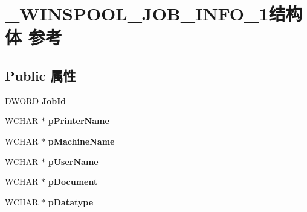 \hypertarget{struct___w_i_n_s_p_o_o_l___j_o_b___i_n_f_o__1}{}\section{\+\_\+\+W\+I\+N\+S\+P\+O\+O\+L\+\_\+\+J\+O\+B\+\_\+\+I\+N\+F\+O\+\_\+1结构体 参考}
\label{struct___w_i_n_s_p_o_o_l___j_o_b___i_n_f_o__1}
\subsection*{Public 属性}
\begin{DoxyCompactItemize}
\item 
\mbox{\label{struct___w_i_n_s_p_o_o_l___j_o_b___i_n_f_o__1_a94ffe601af1f9a21d54978d5e63fa25c}} 
D\+W\+O\+RD {\bfseries Job\+Id}
\item 
\mbox{\label{struct___w_i_n_s_p_o_o_l___j_o_b___i_n_f_o__1_a82a255349afd0050f0608d9618446687}} 
W\+C\+H\+AR $\ast$ {\bfseries p\+Printer\+Name}
\item 
\mbox{\label{struct___w_i_n_s_p_o_o_l___j_o_b___i_n_f_o__1_a1e7cc7863a14fd879f5bbf7a5e106245}} 
W\+C\+H\+AR $\ast$ {\bfseries p\+Machine\+Name}
\item 
\mbox{\label{struct___w_i_n_s_p_o_o_l___j_o_b___i_n_f_o__1_a14c50c8d41b450af321ef57bbe9cd878}} 
W\+C\+H\+AR $\ast$ {\bfseries p\+User\+Name}
\item 
\mbox{\label{struct___w_i_n_s_p_o_o_l___j_o_b___i_n_f_o__1_ab6f407b5e90e2885db0a52fd241fdfc8}} 
W\+C\+H\+AR $\ast$ {\bfseries p\+Document}
\item 
\mbox{\label{struct___w_i_n_s_p_o_o_l___j_o_b___i_n_f_o__1_a8ca7bc6a7075fd90faf58c404ac41148}} 
W\+C\+H\+AR $\ast$ {\bfseries p\+Datatype}
\item 
\mbox{\label{struct___w_i_n_s_p_o_o_l___j_o_b___i_n_f_o__1_a4e26626021ce74fb03eb6a0350c57e5b}} 

\end{DoxyCompactItemize}
